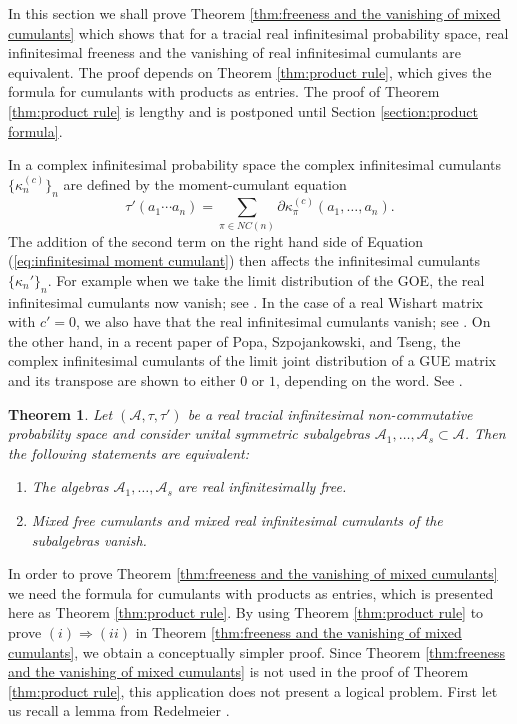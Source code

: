 \documentclass[11pt]{amsart}
\newtheorem{theorem}{Theorem}
\theoremstyle{definition}
\numberwithin{theorem}{section}
\newcommand{\sC}{{{\scriptscriptstyle (c)}}}
\begin{document}
In this section we shall prove Theorem \ref{thm:freeness and
  the vanishing of mixed cumulants} which shows that for a
tracial real infinitesimal probability space, real
infinitesimal freeness and the vanishing of real
infinitesimal cumulants are equivalent. The proof depends on
Theorem \ref{thm:product rule}, which gives the formula for
cumulants with products as entries. The proof of Theorem
\ref{thm:product rule} is lengthy and is postponed until
Section \ref{section:product formula}.

In a complex infinitesimal probability space the complex
infinitesimal cumulants $\{ \kappa^\sC_n\}_n$ are defined by
the moment-cumulant equation
\[
\tau'(a_1 \cdots a_n)=\sum_{\pi\in NC(n)}\partial\kappa_\pi^{\sC}(a_1, \dots, a_n). 
\]
The addition of the second term on the right hand side of
Equation (\ref{eq:infinitesimal moment cumulant}) then
affects the infinitesimal cumulants $\{\kappa_n'\}_n$. For
example when we take the limit distribution of the GOE, the
real infinitesimal cumulants now vanish; see
\cite[Thm. 24]{m}. In the case of a real Wishart matrix with
$c ' = 0$, we also have that the real infinitesimal
cumulants vanish; see \cite[Thm. 21]{mvb}. On the other
hand, in a recent paper of Popa, Szpojankowski, and Tseng,
the complex infinitesimal cumulants of the limit joint
distribution of a GUE matrix and its transpose are shown to
either $0$ or $1$, depending on the word. See \cite[\S
  5]{pst}.

\begin{theorem}\label{thm:freeness and the vanishing of mixed cumulants}
Let $(\mathcal{A},\tau,\tau')$ be a real tracial
infinitesimal non-commutative probability space and consider
unital symmetric subalgebras $\mathcal{A}_1, \dots,
\mathcal{A}_s\subset \mathcal{A}$. Then the following
statements are equivalent:
\begin{enumerate}
\item The algebras $\mathcal{A}_1, \dots, \mathcal{A}_s$ are real infinitesimally free.
\item Mixed free cumulants and mixed real infinitesimal cumulants of the subalgebras vanish.
\end{enumerate} 
\end{theorem}
In order to prove Theorem \ref{thm:freeness and the
  vanishing of mixed cumulants} we need the formula for
cumulants with products as entries, which is presented here
as Theorem \ref{thm:product rule}. By using Theorem
\ref{thm:product rule} to prove $(i) \Rightarrow (ii)$ in
Theorem \ref{thm:freeness and the vanishing of mixed
  cumulants}, we obtain a conceptually simpler proof. Since
Theorem \ref{thm:freeness and the vanishing of mixed
  cumulants} is not used in the proof of Theorem
\ref{thm:product rule}, this application does not present a
logical problem. First let us recall a lemma from Redelmeier
\cite[Lemma 3.3]{r2}.
\end{document}
